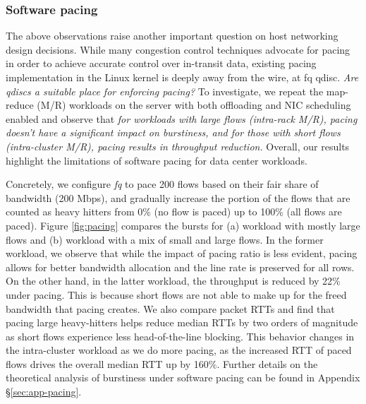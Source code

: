 \subsubsection{Software pacing}
\label{sec:pacing}
The above observations raise another important question on host networking design decisions. While many congestion control techniques \cite{bbr,homa,swift,outcast,pacing} advocate for pacing in order to achieve accurate control over in-transit data, existing pacing implementation in the Linux kernel is deeply away from the wire, at fq qdisc. \emph{Are qdiscs a suitable place for enforcing pacing?}
To investigate, we repeat the map-reduce (M/R) workloads on the server with both offloading and NIC scheduling enabled and observe that \textit{for workloads with large flows (intra-rack M/R), pacing doesn't have a significant impact on burstiness, and for those with short flows (intra-cluster M/R), pacing results in throughput reduction.} Overall, our results highlight the limitations of software pacing for data center workloads.



Concretely, we configure \textit{fq} to pace 200 flows based on their fair share of bandwidth (200 Mbps), and gradually increase the portion of the flows that are counted as heavy hitters from 0\% (no flow is paced) up to 100\% (all flows are paced).
Figure \ref{fig:pacing} compares the bursts for (a) workload with mostly large flows and (b) workload with a mix of small and large flows. 
In the former workload, we observe that while the impact of pacing ratio is less evident, pacing allows for better bandwidth allocation and the line rate is preserved for all rows. On the other hand, in the latter workload, the throughput is reduced by 22\% under pacing.
This is because short flows are not able to make up for the freed bandwidth that pacing creates.
We also compare packet RTTs and find that pacing large heavy-hitters helps reduce median RTTs by two orders of magnitude as short flows experience less head-of-the-line blocking. This behavior changes in the intra-cluster workload as we do more pacing, as the increased RTT of paced flows drives the overall median RTT up by 160\%.
Further details on the theoretical analysis of burstiness under software pacing can be found in Appendix \S\ref{sec:app-pacing}.


